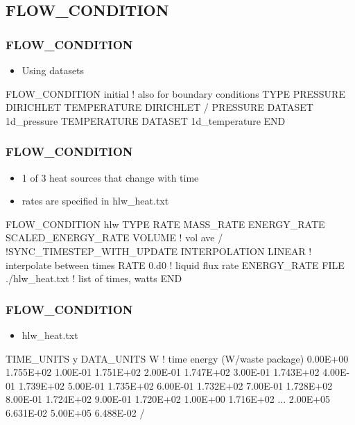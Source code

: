 \documentclass{beamer}
\newcommand\redcomment[1]{{{\color{red} #1}}}
\newcommand\bluecomment[1]{{{\color{blue} #1}}}
\newcommand\greencomment[1]{{{\color{green} #1}}}
\begin{document}
\subsection{FLOW\_CONDITION}

\begin{frame}[fragile]\frametitle{FLOW\_CONDITION}
\begin{itemize}
  \item{Using \redcomment{datasets}}
\end{itemize}

\begin{semiverbatim}
FLOW_CONDITION initial \bluecomment{! also for boundary conditions}
  TYPE
    PRESSURE DIRICHLET
    TEMPERATURE DIRICHLET
  /
  PRESSURE DATASET 1d_pressure
  TEMPERATURE DATASET 1d_temperature
END

\end{semiverbatim}
\end{frame}

\begin{frame}[fragile]\frametitle{FLOW\_CONDITION}
\begin{itemize}
  \item{1 of 3 heat \redcomment{sources} that change with time}
  \item{rates are specified in \greencomment{hlw\_heat.txt}}
\end{itemize}

\begin{semiverbatim}
FLOW_CONDITION hlw
  TYPE
    RATE MASS_RATE
    ENERGY_RATE SCALED_ENERGY_RATE VOLUME \bluecomment{! vol ave}
  /
  \bluecomment{!SYNC_TIMESTEP_WITH_UPDATE}
  INTERPOLATION LINEAR \bluecomment{! interpolate between times}
  RATE 0.d0 \bluecomment{! liquid flux rate}
  ENERGY_RATE FILE ./hlw_heat.txt \bluecomment{! list of times, watts}
END

\end{semiverbatim}
\end{frame}

\begin{frame}[fragile]\frametitle{FLOW\_CONDITION}
\begin{itemize}
  \item{\greencomment{hlw\_heat.txt}}
\end{itemize}

\begin{semiverbatim}\small
TIME_UNITS y
DATA_UNITS W
\bluecomment{! time energy (W/waste package)}
0.00E+00        1.755E+02
1.00E-01        1.751E+02
2.00E-01        1.747E+02
3.00E-01        1.743E+02
4.00E-01        1.739E+02
5.00E-01        1.735E+02
6.00E-01        1.732E+02
7.00E-01        1.728E+02
8.00E-01        1.724E+02
9.00E-01        1.720E+02
1.00E+00        1.716E+02
\bluecomment{...}
2.00E+05        6.631E-02
5.00E+05        6.488E-02
/
\end{semiverbatim}
\end{frame}
\end{document}
